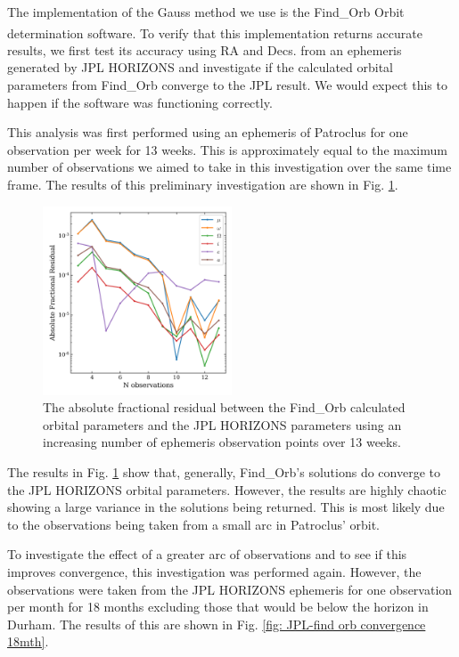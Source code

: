 \documentclass[10pt, twocolumn]{revtex4}    %
\newcommand{\scite}[1]{\textsuperscript{\cite{#1}}}
\begin{document}
The implementation of the Gauss method we use is the Find\_Orb Orbit determination software.\scite{FindOrbOrbit} To verify that this implementation returns accurate results, we first test its accuracy using RA and Decs. from an ephemeris generated by JPL HORIZONS and investigate if the calculated orbital parameters from Find\_Orb converge to the JPL result. We would expect this to happen if the software was functioning correctly. 

This analysis was first performed using an ephemeris of Patroclus for one observation per week for 13 weeks. This is approximately equal to the maximum number of observations we aimed to take in this investigation over the same time frame. The results of this preliminary investigation are shown in Fig. \ref{fig: JPL-find orb convergence}.

\begin{figure}[h!]
\centering
\includegraphics[width=0.5\textwidth]{20180331_151420_JPL_FINDORB_CONVERGENCE}
\caption{The absolute fractional residual between the Find\_Orb calculated orbital parameters and the JPL HORIZONS parameters using an increasing number of ephemeris observation points over 13 weeks.}
\label{fig: JPL-find orb convergence}
\end{figure}

The results in Fig. \ref{fig: JPL-find orb convergence} show that, generally, Find\_Orb's solutions do converge to the JPL HORIZONS orbital parameters. However, the results are highly chaotic showing a large variance in the solutions being returned. This is most likely due to the observations being taken from a small arc in Patroclus' orbit.

To investigate the effect of a greater arc of observations and to see if this improves convergence, this investigation was performed again. However, the observations were taken from the JPL HORIZONS ephemeris for one observation per month for 18 months excluding those that would be below the horizon in Durham. The results of this are shown in Fig. \ref{fig: JPL-find orb convergence 18mth}.
\end{document}
